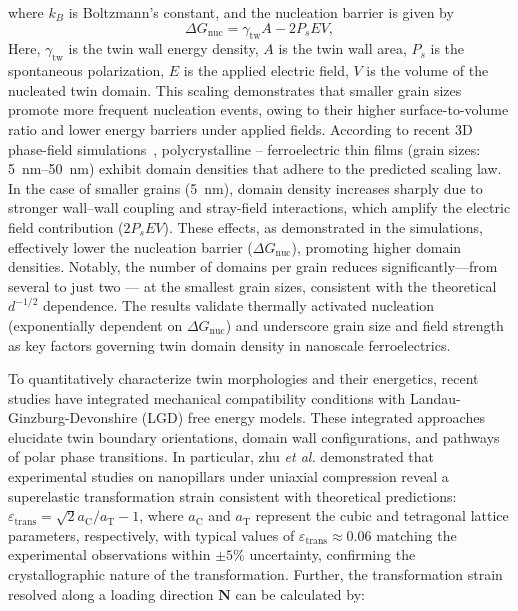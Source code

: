 \documentclass[a4paper,fleqn]{cas-sc}
\begin{document}
where \(k_B\) is Boltzmann’s constant, and the nucleation barrier is given by
\begin{equation}
    \Delta G_{\text{nuc}} = \gamma_{\text{tw}} A - 2 P_s E V,
\end{equation}
Here, \(\gamma_{\text{tw}}\) is the twin wall energy density, \(A\) is the twin wall area, \(P_s\) is the spontaneous polarization, \(E\) is the applied electric field, \(V\) is the volume of the nucleated twin domain. This scaling demonstrates that smaller grain sizes promote more frequent nucleation events, owing to their higher surface-to-volume ratio and lower energy barriers under applied fields. According to recent 3D phase-field simulations~\cite{kumar20243d}, polycrystalline -- ferroelectric thin films (grain sizes: \SIrange{5}{50}{\nano\meter}) exhibit domain densities that adhere to the predicted scaling law. In the case of smaller grains (\SI{5}{\nano\meter}), domain density increases sharply due to stronger wall--wall coupling and stray-field interactions, which amplify the electric field contribution ($2P_s E V$). These effects, as demonstrated in the simulations, effectively lower the nucleation barrier ($\Delta G_{\text{nuc}}$), promoting higher domain densities. Notably, the number of domains per grain reduces significantly---from several to just two --- at the smallest grain sizes, consistent with the theoretical $d^{-1/2}$ dependence. The results validate thermally activated nucleation (exponentially dependent on $\Delta G_{\text{nuc}}$) and underscore grain size and field strength as key factors governing twin domain density in nanoscale ferroelectrics.
\par To quantitatively characterize twin morphologies and their energetics, recent studies have integrated mechanical compatibility conditions with Landau-Ginzburg-Devonshire (LGD) free energy models. These integrated approaches elucidate twin boundary orientations, domain wall configurations, and pathways of polar phase transitions. In particular, zhu \textit{et al.} \cite{zhu2024twinning} demonstrated that experimental studies on  nanopillars under uniaxial compression reveal a superelastic transformation strain consistent with theoretical predictions: $\varepsilon_{\text{trans}} = \sqrt{2}a_{\text{C}}/a_{\text{T}} - 1$, where $a_{\text{C}}$ and $a_{\text{T}}$ represent the cubic and tetragonal lattice parameters, respectively, with typical values of $\varepsilon_{\text{trans}} \approx 0.06$ matching the experimental observations within $\pm 5\%$ uncertainty, confirming the crystallographic nature of the transformation. Further, the transformation strain resolved along a loading direction $\mathbf{N}$ can be calculated by:
\end{document}

